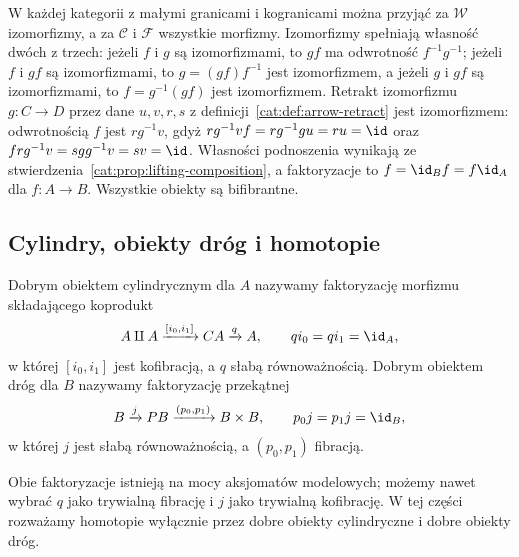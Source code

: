 \begin{przyklad}\label{cat:ex:discrete-model-structure}
W każdej kategorii z małymi granicami i kogranicami można przyjąć za $\mathcal W$ izomorfizmy, a za $\mathcal C$ i $\mathcal F$ wszystkie morfizmy. Izomorfizmy spełniają własność dwóch z trzech: jeżeli $f$ i $g$ są izomorfizmami, to $gf$ ma odwrotność $f^{-1}g^{-1}$; jeżeli $f$ i $gf$ są izomorfizmami, to $g=(gf)f^{-1}$ jest izomorfizmem, a jeżeli $g$ i $gf$ są izomorfizmami, to $f=g^{-1}(gf)$ jest izomorfizmem. Retrakt izomorfizmu $g:C\to D$ przez dane $u,v,r,s$ z definicji~\ref{cat:def:arrow-retract} jest izomorfizmem: odwrotnością $f$ jest $rg^{-1}v$, gdyż $rg^{-1}vf=rg^{-1}gu=ru=\id$ oraz $frg^{-1}v=sgg^{-1}v=sv=\id$. Własności podnoszenia wynikają ze stwierdzenia~\ref{cat:prop:lifting-composition}, a faktoryzacje to $f=\id_B f=f\id_A$ dla $f:A\to B$. Wszystkie obiekty są bifibrantne.
\end{przyklad}


\subsection{Cylindry, obiekty dróg i homotopie}

\begin{definicja}\label{cat:def:model-cylinder-path}
Dobrym obiektem cylindrycznym dla $A$ nazywamy faktoryzację morfizmu składającego koprodukt
\[
 A\amalg A\xrightarrow{[i_0,i_1]}C A\xrightarrow{q}A,
 \qquad qi_0=qi_1=\id_A,
\]
w której $[i_0,i_1]$ jest kofibracją, a $q$ słabą równoważnością.
Dobrym obiektem dróg dla $B$ nazywamy faktoryzację przekątnej
\[
 B\xrightarrow{j}P B\xrightarrow{(p_0,p_1)}B\times B,
 \qquad p_0j=p_1j=\id_B,
\]
w której $j$ jest słabą równoważnością, a $(p_0,p_1)$ fibracją.
\end{definicja}
Obie faktoryzacje istnieją na mocy aksjomatów modelowych; możemy nawet wybrać $q$ jako trywialną fibrację i $j$ jako trywialną kofibrację. W tej części rozważamy homotopie wyłącznie przez dobre obiekty cylindryczne i dobre obiekty dróg.

\begin{center}

\medskip
{}
\end{center}

